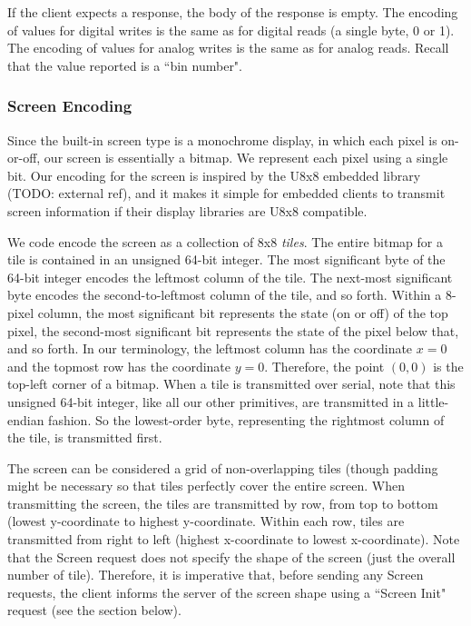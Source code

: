 \documentclass[12pt]{article}
\begin{document}
If the client expects a response, the body of the response is empty.  The encoding of values for digital writes is the same as for digital reads (a single byte, 0 or 1).  The encoding of values for analog writes is the same as for analog reads.  Recall that the value reported is a ``bin number".

\subsubsection{Screen Encoding}
Since the built-in screen type is a monochrome display, in which each pixel is on-or-off, our screen is essentially a bitmap.  We represent each pixel using a single bit.  Our encoding for the screen is inspired by the U8x8 embedded library (TODO: external ref), and it makes it simple for embedded clients to transmit screen information if their display libraries are U8x8 compatible.

We code encode the screen as a collection of 8x8 \textit{tiles}.  The entire bitmap for a tile is contained in an unsigned 64-bit integer.  The most significant byte of the 64-bit integer encodes the leftmost column of the tile.  The next-most significant byte encodes the second-to-leftmost column of the tile, and so forth.  Within a 8-pixel column, the most significant bit represents the state (on or off) of the top pixel, the second-most significant bit represents the state of the pixel below that, and so forth.  In our terminology, the leftmost column has the coordinate $x=0$ and the topmost row has the coordinate $y=0$.  Therefore, the point $(0, 0)$ is the top-left corner of a bitmap.  When a tile is transmitted over serial, note that this unsigned 64-bit integer, like all our other primitives, are transmitted in a little-endian fashion.  So the lowest-order byte, representing the rightmost column of the tile, is transmitted first.

The screen can be considered a grid of non-overlapping tiles (though padding might be necessary so that tiles perfectly cover the entire screen.  When transmitting the screen, the tiles are transmitted by row, from top to bottom (lowest y-coordinate to highest y-coordinate.  Within each row, tiles are transmitted from right to left (highest x-coordinate to lowest x-coordinate).  Note that the Screen request does not specify the shape of the screen (just the overall number of tile).  Therefore, it is imperative that, before sending any Screen requests, the client informs the server of the screen shape using a ``Screen Init" request (see the section below).
\end{document}
